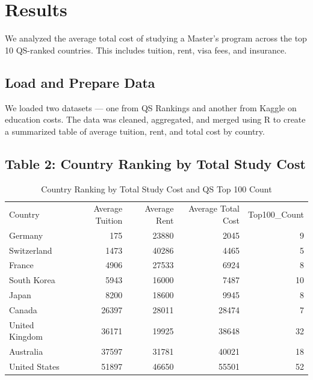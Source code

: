 \documentclass[
  letterpaper,
  DIV=11,
  numbers=noendperiod]{scrartcl}
\begin{document}
\section{Results}\label{results}

We analyzed the average total cost of studying a Master's program across
the top 10 QS-ranked countries. This includes tuition, rent, visa fees,
and insurance.

\subsection{Load and Prepare Data}\label{load-and-prepare-data}

We loaded two datasets --- one from QS Rankings and another from Kaggle
on education costs. The data was cleaned, aggregated, and merged using R
to create a summarized table of average tuition, rent, and total cost by
country.

\subsection{Table 2: Country Ranking by Total Study
Cost}\label{table-2-country-ranking-by-total-study-cost}

\begin{longtable}[t]{lrrrr}

\caption{\label{tbl-results}Country Ranking by Total Study Cost and QS
Top 100 Count}

\tabularnewline

\\
\toprule
Country & Average Tuition & Average Rent & Average Total Cost & Top100\_Count\\
\midrule
Germany & 175 & 23880 & 2045 & 9\\
Switzerland & 1473 & 40286 & 4465 & 5\\
France & 4906 & 27533 & 6924 & 8\\
South Korea & 5943 & 16000 & 7487 & 10\\
Japan & 8200 & 18600 & 9945 & 8\\
\addlinespace
Canada & 26397 & 28011 & 28474 & 7\\
United Kingdom & 36171 & 19925 & 38648 & 32\\
Australia & 37597 & 31781 & 40021 & 18\\
United States & 51897 & 46650 & 55501 & 52\\
\bottomrule

\end{longtable}
\end{document}
